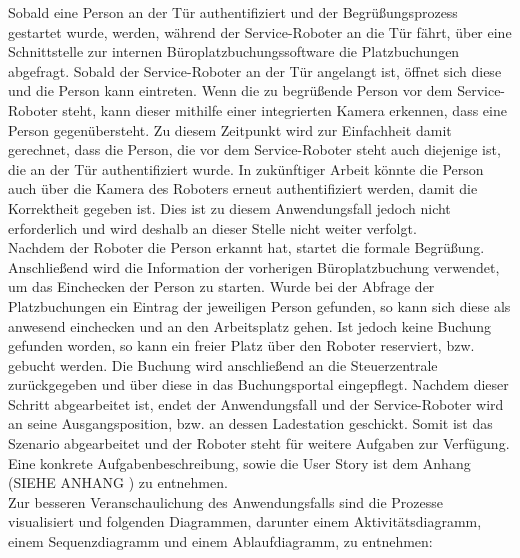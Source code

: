     Sobald eine Person an der Tür authentifiziert und der Begrüßungsprozess gestartet wurde, werden, während der Service-Roboter an 
    die Tür fährt, über eine Schnittstelle zur internen Büroplatzbuchungssoftware die Platzbuchungen abgefragt. 
    Sobald der Service-Roboter an der Tür angelangt ist, öffnet sich diese und die Person kann eintreten. Wenn die zu begrüßende 
    Person vor dem Service-Roboter steht, kann dieser mithilfe einer integrierten Kamera erkennen, dass eine Person gegenübersteht. 
    Zu diesem Zeitpunkt wird zur Einfachheit damit gerechnet, dass die Person, die vor dem Service-Roboter steht auch diejenige 
    ist, die an der Tür authentifiziert wurde. In zukünftiger Arbeit könnte die Person auch über die Kamera des Roboters erneut 
    authentifiziert werden, damit die Korrektheit gegeben ist. Dies ist zu diesem Anwendungsfall jedoch nicht erforderlich und 
    wird deshalb an dieser Stelle nicht weiter verfolgt.
    \\
    \linebreak
    Nachdem der Roboter die Person erkannt hat, startet die formale Begrüßung. Anschließend wird die Information der 
    vorherigen Büroplatzbuchung verwendet, um das Einchecken der Person zu starten. Wurde bei der Abfrage der Platzbuchungen ein 
    Eintrag der jeweiligen Person gefunden, so kann sich diese als anwesend einchecken und an den Arbeitsplatz gehen. Ist jedoch keine 
    Buchung gefunden worden, so kann ein freier Platz über den Roboter reserviert, bzw. gebucht werden. Die Buchung wird 
    anschließend an die Steuerzentrale zurückgegeben und über diese in das Buchungsportal eingepflegt. Nachdem dieser 
    Schritt abgearbeitet ist, endet der Anwendungsfall und der Service-Roboter wird an seine Ausgangsposition, bzw. an dessen 
    Ladestation geschickt. Somit ist das Szenario abgearbeitet und der Roboter steht für weitere Aufgaben zur Verfügung. 
    \\
    \linebreak
    Eine konkrete Aufgabenbeschreibung, sowie die User Story ist dem Anhang (SIEHE ANHANG %
    ) zu entnehmen. 
    \\
    Zur besseren Veranschaulichung des Anwendungsfalls sind die Prozesse visualisiert und folgenden Diagrammen, darunter 
    einem Aktivitätsdiagramm, einem Sequenzdiagramm und einem Ablaufdiagramm, zu entnehmen: 
    

